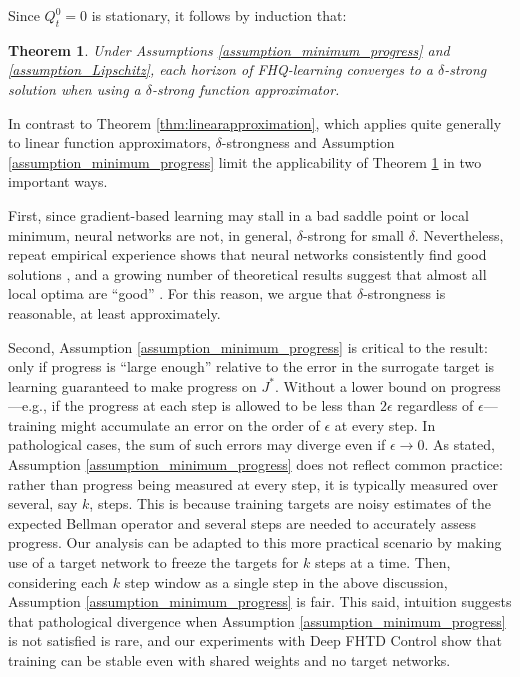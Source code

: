 \documentclass[letterpaper]{article} %
\newtheorem{theorem}{Theorem}
\begin{document}
Since $Q^0_t = 0$ is stationary, it follows by induction that:

\begin{theorem}\label{thm:generalapproximation}
Under Assumptions \ref{assumption_minimum_progress} and \ref{assumption_Lipschitz}, each horizon of FHQ-learning converges to a $\delta$-strong solution when using a $\delta$-strong function approximator.
\end{theorem}

In contrast to Theorem \ref{thm:linearapproximation}, which applies quite generally to linear function approximators, $\delta$-strongness and Assumption \ref{assumption_minimum_progress} limit the applicability of Theorem \ref{thm:generalapproximation} in two important ways.

First, since gradient-based learning may stall in a bad saddle point or local minimum, neural networks are not, in general, $\delta$-strong for small $\delta$. Nevertheless, repeat empirical experience shows that neural networks consistently find good solutions \cite{zhang2016understanding}, and a growing number of theoretical results suggest that almost all local optima are ``good'' \cite{pascanu2014saddle,choromanska2015loss,pennington2017geometry}. For this reason, we argue that $\delta$-strongness is reasonable, at least approximately.

Second, Assumption \ref{assumption_minimum_progress} is critical to the result: only if progress is ``large enough'' relative to the error in the surrogate target is learning guaranteed to make progress on $J^*$. Without a lower bound on progress---e.g., if the progress at each step is allowed to be less than $2\epsilon$ regardless of $\epsilon$---training might accumulate an error on the order of $\epsilon$ at every step. In pathological cases, the sum of such errors may diverge even if $\epsilon \to 0$. As stated, Assumption \ref{assumption_minimum_progress} does not reflect common practice: rather than  progress being measured at every step, it is typically measured over several, say $k$, steps. This is because training targets are noisy estimates of the expected Bellman operator and several steps are needed to accurately assess progress. Our analysis can be adapted to this more practical scenario by making use of a target network \cite{dqn2015} to freeze the targets for $k$ steps at a time. Then, considering each $k$ step window as a single step in the above discussion, Assumption \ref{assumption_minimum_progress} is fair.
This said, intuition suggests that pathological divergence when Assumption \ref{assumption_minimum_progress} is not satisfied is rare, and our experiments with Deep FHTD Control show that training can be stable even with shared weights and no target networks.
\end{document}
